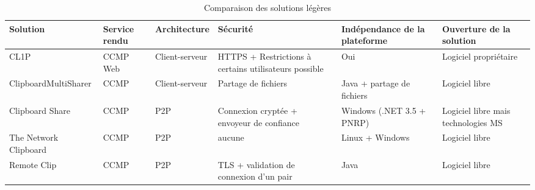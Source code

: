\begin{sidewaystable}[!h]
  \centering
  \begin{tabular}{|l|l|l|m{7em}|m{7em}|m{7em}|}
    \hline
    Solution & Service rendu & Architecture & Sécurité & In\-dé\-pen\-dance
    de la plateforme & Ouverture de la solution \\
    \hline
    \hline
    CL1P & CCMP Web & Client-serveur & HTTPS + Restrictions à certains
    utilisateurs possible & Oui & Logiciel propriétaire \\
    \hline
    Clipboard\-MultiSharer & CCMP & Client-serveur & Partage de fichiers & Java
    + partage de fichiers & Logiciel libre\\
    \hline
    Clipboard Share & CCMP & P2P & Connexion cryptée + envoyeur de confiance &
    Windows (.NET 3.5 + PNRP) & Logiciel libre mais technologies MS \\
    \hline
    The Network Clipboard & CCMP & P2P & aucune & Linux + Windows &
    Logiciel libre \\
    \hline
    Remote Clip & CCMP & P2P & TLS + validation de connexion d'un pair &
    Java & Logiciel libre \\
    \hline
  \end{tabular}
  \caption{\label{tbl:comp_leger} Comparaison des solutions légères}
\end{sidewaystable}
\clearpage
